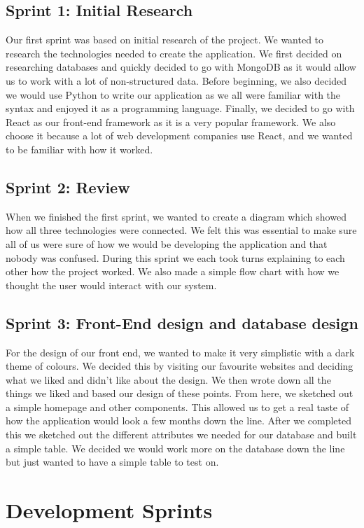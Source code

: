 \subsection{Sprint 1: Initial Research}
Our first sprint was based on initial research of the project. We wanted to research the technologies needed to create the application. We first decided on researching databases and quickly decided to go with MongoDB as it would allow us to work with a lot of non-structured data. Before beginning, we also decided we would use Python to write our application as we all were familiar with the syntax and enjoyed it as a programming language. Finally, we decided to go with React as our front-end framework as it is a very popular framework. We also choose it because a lot of web development companies use React, and we wanted to be familiar with how it worked.

\subsection{Sprint 2: Review}
When we finished the first sprint, we wanted to create a diagram which showed how all three technologies were connected. We felt this was essential to make sure all of us were sure of how we would be developing the application and that nobody was confused. During this sprint we each took turns explaining to each other how the project worked. We also made a simple flow chart with how we thought the user would interact with our system.

\subsection{Sprint 3: Front-End design and database design}
For the design of our front end, we wanted to make it very simplistic with a dark theme of colours. We decided this by visiting our favourite websites and deciding what we liked and didn’t like about the design. We then wrote down all the things we liked and based our design of these points. From here, we sketched out a simple homepage and other components. This allowed us to get a real taste of how the application would look a few months down the line. After we completed this we sketched out the different attributes we needed for our database and built a simple table. We decided we would work more on the database down the line but just wanted to have a simple table to test on.

\section{Development Sprints}
